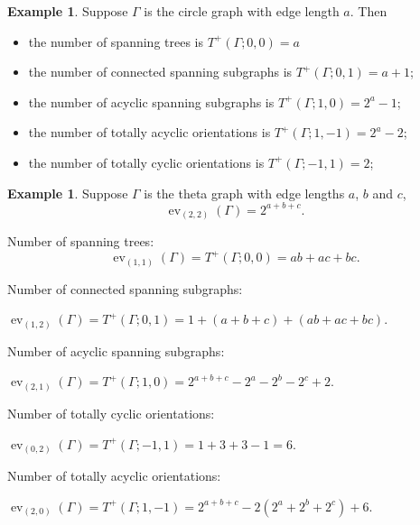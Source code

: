 \documentclass{amsart}
\theoremstyle{definition}
\newtheorem{eg}[thm]{Example}
\DeclareMathOperator{\ev}{ev}
\begin{document}
\begin{eg}
Suppose $\Gamma$ is the circle graph with edge length $a$. Then
\begin{itemize}
\item 
the number of spanning trees is 
$T^+(\Gamma; 0, 0) = a$

\item 
the number of connected spanning subgraphs is
$T^+(\Gamma; 0, 1) = a + 1$;

\item 
the number of acyclic spanning subgraphs is
$T^+(\Gamma; 1, 0) = 2^a - 1$;

\item 
the number of totally acyclic orientations is
$T^+(\Gamma; 1, -1) = 2^a - 2$;

\item 
the number of totally cyclic orientations is
$T^+(\Gamma; -1, 1) = 2$;

\end{itemize}
\end{eg}

\begin{eg}
Suppose $\Gamma$ is the theta graph with edge lengths $a$, $b$ and $c$,
\[ \ev_{(2,2)}(\Gamma) = 2^{a + b + c} .\]

Number of spanning trees:
\[\ev_{(1,1)}(\Gamma) = T^+(\Gamma; 0,0) = ab + ac + bc.\]

Number of connected spanning subgraphs:

$\ev_{(1,2)}(\Gamma) = T^+(\Gamma; 0,1) = 1 + (a + b + c) + (ab + ac + bc)$.

Number of acyclic spanning subgraphs:

$\ev_{(2,1)}(\Gamma) = T^+(\Gamma; 1,0) 
= 2^{a+b+c} - 2^a - 2^b - 2^c + 2$.

Number of totally cyclic orientations:

$\ev_{(0,2)}(\Gamma) = T^+(\Gamma; -1,1) = 1 + 3 + 3 - 1 = 6$.

Number of totally acyclic orientations:

$\ev_{(2,0)}(\Gamma) = T^+(\Gamma; 1,-1) = 2^{a+b+c} - 2(2^a + 2^b + 2^c) + 6$.
\end{eg}
\end{document}

